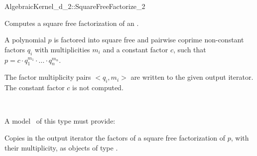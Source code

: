 \begin{ccRefFunctionObjectConcept}{AlgebraicKernel_d_2::SquareFreeFactorize_2}

\ccDefinition
Computes a square free factorization of an
.

A polynomial $p$ is factored into square free and pairwise 
coprime non-constant factors $q_i$ with multiplicities $m_i$ 
and a constant factor $c$, such that 
$p = c  \cdot  q_1^{m_1}  \cdot  ...  \cdot  q_n^{m_n}$.

The factor multiplicity pairs $<q_i,m_i>$ are written to the 
given output iterator. The constant factor $c$ is not computed. 

\ccRefines 
{}\\

\ccOperations
{}

A model \ccVar\ of this type must provide:

{Copies in the output iterator the factors of a square free 
factorization of $p$, with their multiplicity, as objects of type 
.}

\ccSeeAlso
{}\\
\\

\end{ccRefFunctionObjectConcept}
